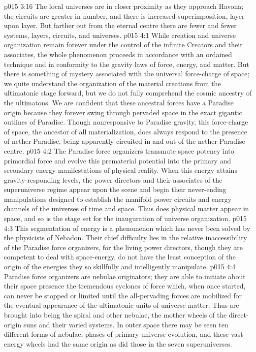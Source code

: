 \vs p015 3:16 \pc The local universes are in closer proximity as they approach Havona; the circuits are greater in number, and there is increased superimposition, layer upon layer. But farther out from the eternal centre there are fewer and fewer systems, layers, circuits, and universes.
\vs p015 4:1 While creation and universe organization remain forever under the control of the infinite Creators and their associates, the whole phenomenon proceeds in accordance with an ordained technique and in conformity to the gravity laws of force, energy, and matter. But there is something of mystery associated with the universal force\hyp{}charge of space; we quite understand the organization of the material creations from the ultimatonic stage forward, but we do not fully comprehend the cosmic ancestry of the ultimatons. We are confident that these ancestral forces have a Paradise origin because they forever swing through pervaded space in the exact gigantic outlines of Paradise. Though nonresponsive to Paradise gravity, this force\hyp{}charge of space, the ancestor of all materialization, does always respond to the presence of nether Paradise, being apparently circuited in and out of the nether Paradise centre.
\vs p015 4:2 The Paradise force organizers transmute space potency into primordial force and evolve this prematerial potential into the primary and secondary energy manifestations of physical reality. When this energy attains gravity\hyp{}responding levels, the power directors and their associates of the superuniverse regime appear upon the scene and begin their never\hyp{}ending manipulations designed to establish the manifold power circuits and energy channels of the universes of time and space. Thus does physical matter appear in space, and so is the stage set for the inauguration of universe organization.
\vs p015 4:3 This segmentation of energy is a phenomenon which has never been solved by the physicists of Nebadon. Their chief difficulty lies in the relative inaccessibility of the Paradise force organizers, for the living power directors, though they are competent to deal with space\hyp{}energy, do not have the least conception of the origin of the energies they so skillfully and intelligently manipulate.
\vs p015 4:4 \pc Paradise force organizers are nebulae originators; they are able to initiate about their space presence the tremendous cyclones of force which, when once started, can never be stopped or limited until the all\hyp{}pervading forces are mobilized for the eventual appearance of the ultimatonic units of universe matter. Thus are brought into being the spiral and other nebulae, the mother wheels of the direct\hyp{}origin suns and their varied systems. In outer space there may be seen ten different forms of nebulae, phases of primary universe evolution, and these vast energy wheels had the same origin as did those in the seven superuniverses.
